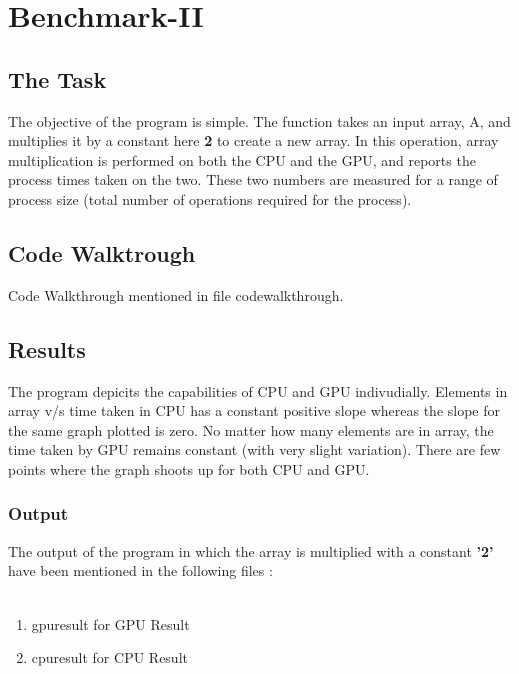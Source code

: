 \chapter{Benchmark-II}

\section{The Task}
The objective of the program is simple. The function takes an input array, A, and multiplies it by a constant here \textbf{2} to create a new array. In this operation, array multiplication is performed on both the CPU and the GPU, and reports the process times taken on the two. These two numbers are measured for a range of process size (total number of operations required for the process).\\

\section{Code Walktrough}
Code Walkthrough mentioned in file codewalkthrough.

\section{Results}
The program depicits the capabilities of CPU and GPU indivudially. Elements in array v/s time taken in CPU has a constant positive slope whereas the slope for the same graph plotted is zero. No matter how many elements are in array, the time taken by GPU remains constant (with very slight variation). There are few points where the graph shoots up for both CPU and GPU.

\subsection{Output}
The output of the program in which the array is multiplied with a constant \textbf{'2'} have been mentioned in the following files :\\\\
\begin{enumerate}
\item gpuresult for GPU Result\\
\item cpuresult for CPU Result\\
\end{enumerate}
